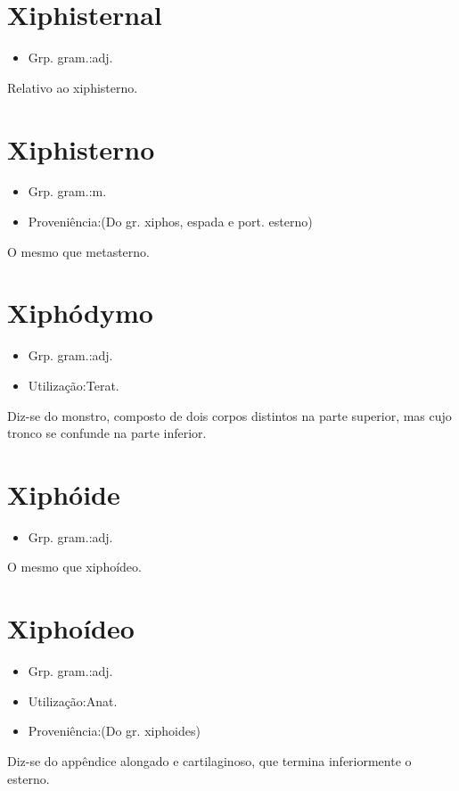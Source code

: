 \section{Xiphisternal}
\begin{itemize}
\item {Grp. gram.:adj.}
\end{itemize}
Relativo ao xiphisterno.
\section{Xiphisterno}
\begin{itemize}
\item {Grp. gram.:m.}
\end{itemize}
\begin{itemize}
\item {Proveniência:(Do gr. \textunderscore xiphos\textunderscore , espada e port. \textunderscore esterno\textunderscore )}
\end{itemize}
O mesmo que \textunderscore metasterno\textunderscore .
\section{Xiphódymo}
\begin{itemize}
\item {Grp. gram.:adj.}
\end{itemize}
\begin{itemize}
\item {Utilização:Terat.}
\end{itemize}
Diz-se do monstro, composto de dois corpos distintos na parte superior, mas cujo tronco se confunde na parte inferior.
\section{Xiphóide}
\begin{itemize}
\item {Grp. gram.:adj.}
\end{itemize}
O mesmo que \textunderscore xiphoídeo\textunderscore .
\section{Xiphoídeo}
\begin{itemize}
\item {Grp. gram.:adj.}
\end{itemize}
\begin{itemize}
\item {Utilização:Anat.}
\end{itemize}
\begin{itemize}
\item {Proveniência:(Do gr. \textunderscore xiphoides\textunderscore )}
\end{itemize}
Diz-se do appêndice alongado e cartilaginoso, que termina inferiormente o esterno.
